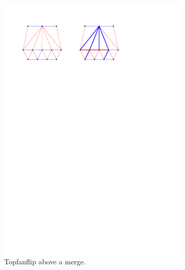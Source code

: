 \begin{figure}[!b]
\begin{subfigure}[b]{0.45 \textwidth}
        \includegraphics[width = \textwidth]{topFanFlips/img/merge}
        \caption{Topfanflip above a merge.}
        \label{fig:fanflip:merge}
    \end{subfigure}
    ~
    \begin{subfigure}[b]{0.45 \textwidth}

\end{subfigure}
\end{figure}
